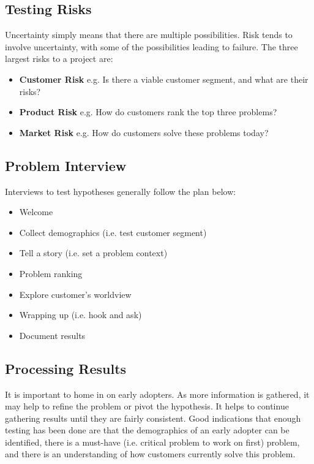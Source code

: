 \documentclass[12pt,titlepage]{article}
\begin{document}
    \subsection{Testing Risks}
      Uncertainty simply means that there are multiple possibilities. Risk tends to involve uncertainty, with some of the possibilities
      leading to failure. The three largest risks to a project are:
      \begin{itemize}
        \item \textbf{Customer Risk} e.g. Is there a viable customer segment, and what are their risks?
        \item \textbf{Product Risk} e.g. How do customers rank the top three problems?
        \item \textbf{Market Risk} e.g. How do customers solve these problems today?
      \end{itemize}

    \subsection{Problem Interview}
      Interviews to test hypotheses generally follow the plan below:
      \begin{itemize}
        \item Welcome
        \item Collect demographics (i.e. test customer segment)
        \item Tell a story (i.e. set a problem context)
        \item Problem ranking
        \item Explore customer's worldview
        \item Wrapping up (i.e. hook and ask)
        \item Document results
      \end{itemize}

    \subsection{Processing Results}
      It is important to home in on early adopters. As more information is gathered, it may help to refine the problem or pivot the hypothesis.
      It helps to continue gathering results until they are fairly consistent. Good indications that enough testing has been done are that
      the demographics of an early adopter can be identified, there is a must-have (i.e. critical problem to work on first) problem, and there is
      an understanding of how customers currently solve this problem.
\end{document}
